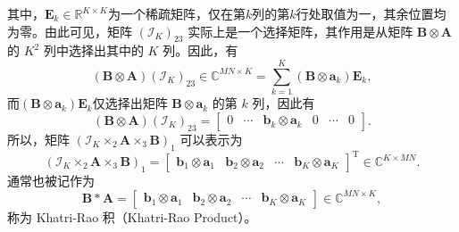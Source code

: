 其中，\( \mathbf{E}_k \in \mathbb{R}^{K \times K} \)为一个稀疏矩阵，仅在第\( k \)列的第\( k \)行处取值为一，其余位置均为零。由此可见，矩阵 \( (\mathcal{I}_K)_{23} \) 实际上是一个选择矩阵，其作用是从矩阵 \( \mathbf{B} \otimes \mathbf{A} \) 的 \( K^2 \) 列中选择出其中的 \( K \) 列。因此，有
\[
    (\mathbf{B} \otimes \mathbf{A}) (\mathcal{I}_K)_{23} \in \mathbb{C}^{M N \times K} = \sum_{k=1}^K (\mathbf{B} \otimes \bm{a}_k) \mathbf{E}_k,
\]
而\( (\mathbf{B} \otimes \bm{a}_k) \mathbf{E}_k \)仅选择出矩阵 \( \mathbf{B} \otimes \bm{a}_k \) 的第 \( k \) 列，因此有
\[
    (\mathbf{B} \otimes \mathbf{A}) (\mathcal{I}_K)_{23} = \begin{bmatrix}
        0 & \cdots & \bm{b}_k \otimes \bm{a}_k & 0 & \cdots & 0
    \end{bmatrix}.
\]
所以，矩阵 \( (\mathcal{I}_K \times_2 \mathbf{A} \times_3 \mathbf{B})_{1} \) 可以表示为
\[
    (\mathcal{I}_K \times_2 \mathbf{A} \times_3 \mathbf{B})_{1} = \begin{bmatrix}
        \bm{b}_1 \otimes \bm{a}_1 & \bm{b}_2 \otimes \bm{a}_2 & \cdots & \bm{b}_K \otimes \bm{a}_K
    \end{bmatrix}^{\mathrm{T}} \in \mathbb{C}^{K \times M N}.
\]
通常也被记作为
\[
    \mathbf{B} \ast  \mathbf{A} = \begin{bmatrix}
        \bm{b}_1 \otimes \bm{a}_1 & \bm{b}_2 \otimes \bm{a}_2 & \cdots & \bm{b}_K \otimes \bm{a}_K
    \end{bmatrix} \in \mathbb{C}^{M N \times K},
\]
称为 Khatri-Rao 积（Khatri-Rao Product）。

